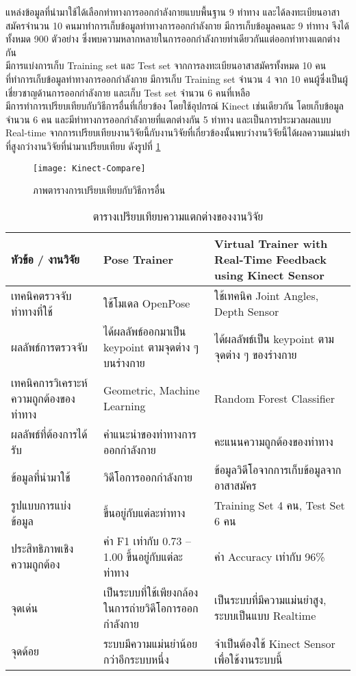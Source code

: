 แหล่งข้อมูลที่นำมาใช้ได้เลือกท่าทางการออกกำลังกายแบบพื้นฐาน 9 ท่าทาง และได้ลงทะเบียนอาสาสมัครจำนวน 10 คนมาทำการเก็บข้อมูลท่าทางการออกกำลังกาย มีการเก็บข้อมูลคนละ 9 ท่าทาง จึงได้ทั้งหมด 900 ตัวอย่าง ซึ่งพบความหลากหลายในการออกกำลังกายท่าเดียวกันแต่ออกท่าทางแตกต่างกัน
\\\indent
มีการแบ่งการเก็บ Training set และ Test set จากการลงทะเบียนอาสาสมัครทั้งหมด 10 คนที่ทำการเก็บข้อมูลท่าทางการออกกำลังกาย มีการเก็บ Training set จำนวน 4 จาก 10 คนผู้ซึ่งเป็นผู้เชี่ยวชาญด้านการออกกำลังกาย และเก็บ Test set จำนวน 6 คนที่เหลือ
\\\indent
มีการทำการเปรียบเทียบกับวิธีการอื่นที่เกี่ยวข้อง โดยใช้อุปกรณ์ Kinect เช่นเดียวกัน โดยเก็บข้อมูลจำนวน 6 คน และมีท่าทางการออกกำลังกายที่แตกต่างกัน 5 ท่าทาง  และเป็นการประมวลผลแบบ Real-time จากการเปรียบเทียบงานวิจัยนี้กับงานวิจัยที่เกี่ยวข้องนั้นพบว่างานวิจัยนี้ได้ผลความแม่นยำที่สูงกว่างานวิจัยที่นำมาเปรียบเทียบ ดังรูปที่ \ref{fig:Kinect-Compare}

\begin{figure}
    \texttt{[image: Kinect-Compare]}
    \caption{ภาพตารางการเปรียบเทียบกับวิธีการอื่น}
    \label{fig:Kinect-Compare}
\end{figure}


\begin{table}
    \caption{ตารางเปรียบเทียบความแตกต่างของงานวิจัย}
    \begin{tabularx}{\textwidth}{ | p{4.45cm} | X | X | }
        \hline
        \textbf{หัวข้อ / งานวิจัย} & \textbf{Pose Trainer} & \textbf{Virtual Trainer with Real-Time Feedback using Kinect Sensor}\\\hline
        เทคนิคตรวจจับท่าทางที่ใช้ & ใช้โมเดล OpenPose & ใช้เทคนิค Joint Angles, Depth Sensor\\\hline
        ผลลัพธ์การตรวจจับ & ได้ผลลัพธ์ออกมาเป็น keypoint ตามจุดต่าง ๆ บนร่างกาย & ได้ผลลัพธ์เป็น keypoint ตามจุดต่าง ๆ ของร่างกาย\\\hline
        เทคนิคการวิเคราะห์ความถูกต้องของท่าทาง & Geometric, Machine Learning & Random Forest Classifier\\\hline
        ผลลัพธ์ที่ต้องการได้รับ & คำแนะนำของท่าทางการออกกำลังกาย & คะแนนความถูกต้องของท่าทาง\\\hline
        ข้อมูลที่นำมาใช้ & วิดีโอการออกกำลังกาย & ข้อมูลวิดีโอจากการเก็บข้อมูลจากอาสาสมัคร\\\hline
        รูปแบบการแบ่งข้อมูล & ขึ้นอยู่กับแต่ละท่าทาง & Training Set 4 คน, Test Set 6 คน\\\hline
        ประสิทธิภาพเชิงความถูกต้อง & ค่า F1 เท่ากับ 0.73 – 1.00 ขึ้นอยู่กับแต่ละท่าทาง & ค่า Accuracy เท่ากับ 96\%\\\hline
        จุดเด่น & เป็นระบบที่ใช้เพียงกล้องในการถ่ายวิดีโอการออกกำลังกาย  & เป็นระบบที่มีความแม่นยำสูง, ระบบเป็นแบบ Realtime\\\hline
        จุดด้อย & ระบบมีความแม่นยำน้อยกว่าอีกระบบหนึ่ง & จำเป็นต้องใช้ Kinect Sensor เพื่อใช้งานระบบนี้\\\hline
    \end{tabularx}
\end{table}
\clearpage


